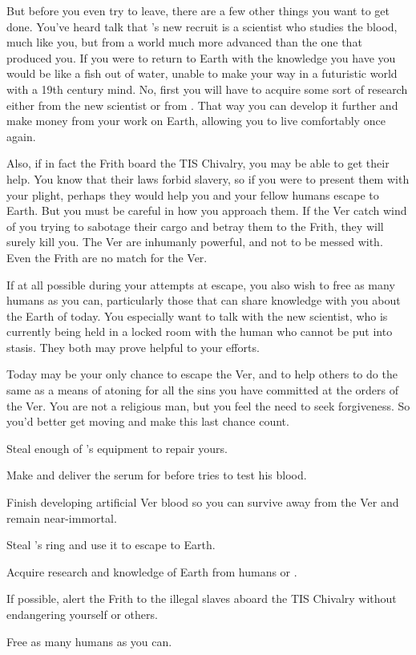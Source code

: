 \documentclass[char]{guildcamp4}
\begin{document}
But before you even try to leave, there are a few other things you want to get done. You've heard talk that \cVone{}'s new recruit is a scientist who studies the blood, much like you, but from a world much more advanced than the one that produced you. If you were to return to Earth with the knowledge you have you would be like a fish out of water, unable to make your way in a futuristic world with a 19th century mind. No, first you will have to acquire some sort of research either from the new scientist or from \cVthree{}. That way you can develop it further and make money from your work on Earth, allowing you to live comfortably once again.

Also, if in fact the Frith board the TIS Chivalry, you may be able to get their help. You know that their laws forbid slavery, so if you were to present them with your plight, perhaps they would help you and your fellow humans escape to Earth. But you must be careful in how you approach them. If the Ver catch wind of you trying to sabotage their cargo and betray them to the Frith, they will surely kill you. The Ver are inhumanly powerful, and not to be messed with. Even the Frith are no match for the Ver.

If at all possible during your attempts at escape, you also wish to free as many humans as you can, particularly those that can share knowledge with you about the Earth of today. You especially want to talk with the new scientist, who is currently being held in a locked room with the human who cannot be put into stasis. They both may prove helpful to your efforts.

Today may be your only chance to escape the Ver, and to help others to do the same as a means of atoning for all the sins you have committed at the orders of the Ver. You are not a religious man, but you feel the need to seek forgiveness. So you'd better get moving and make this last chance count.

\begin{itemz}[Goals]
	\item Steal enough of \cVthree{}'s equipment to repair yours.
	\item Make and deliver the serum for \cRasputin{} before \cVthree{} tries to test his blood.
	\item Finish developing artificial Ver blood so you can survive away from the Ver and remain near-immortal.
	\item Steal \cVone{}'s ring and use it to escape to Earth.
	\item Acquire research and knowledge of Earth from humans or \cVthree{}.
	\item If possible, alert the Frith to the illegal slaves aboard the TIS Chivalry without endangering yourself or others.
	\item Free as many humans as you can.
\end{itemz}
\end{document}
